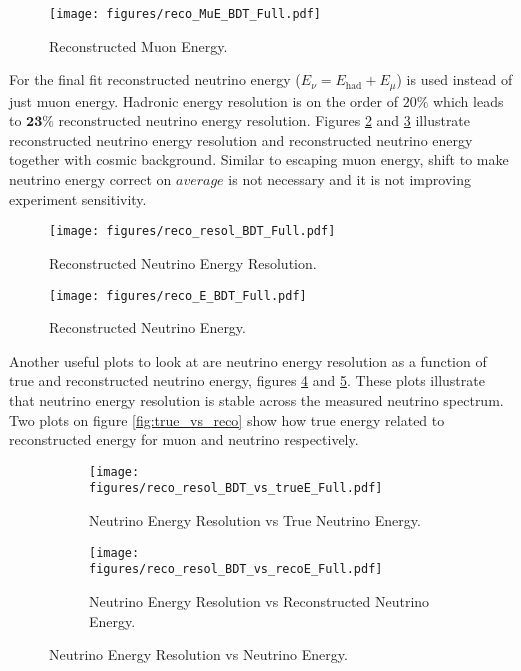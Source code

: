 \begin{figure}[!th]
\centering
\texttt{[image: figures/reco\_MuE\_BDT\_Full.pdf]}
\caption{Reconstructed Muon Energy.}
\label{fig:recoMuE}
\end{figure}

For the final fit reconstructed neutrino energy ($E_\nu = E_{\text{had}} + E_\mu$) is used instead 
of just muon energy. Hadronic energy resolution is on the order of $20\%$ which leads to 
$\textbf{23\%}$ reconstructed neutrino energy resolution. Figures \ref{fig:recoE_resol} and 
\ref{fig:recoE} illustrate reconstructed neutrino energy resolution and reconstructed neutrino
energy together with cosmic background. Similar to escaping muon energy, shift to make neutrino
energy correct on $\textit{average}$ is not necessary and it is not improving experiment sensitivity.
\begin{figure}[!th]
\centering
\texttt{[image: figures/reco\_resol\_BDT\_Full.pdf]}
\caption{Reconstructed Neutrino Energy Resolution.}
\label{fig:recoE_resol}
\end{figure}

\begin{figure}[!th]
\centering
\texttt{[image: figures/reco\_E\_BDT\_Full.pdf]}
\caption{Reconstructed Neutrino Energy.}
\label{fig:recoE}
\end{figure}

Another useful plots to look at are neutrino energy resolution as a function of true and reconstructed
neutrino energy, figures \ref{fig:resol_vs_trueE} and \ref{fig:resol_vs_recoE}. These plots illustrate that 
neutrino energy resolution is stable across the measured neutrino spectrum. Two plots on figure 
\ref{fig:true_vs_reco} show how true energy related to reconstructed energy for muon and neutrino respectively.
\begin{figure}[!th]
\centering
\begin{subfigure}[t]{0.95\textwidth}
  \centering
  \texttt{[image: figures/reco\_resol\_BDT\_vs\_trueE\_Full.pdf]}
  \caption{Neutrino Energy Resolution vs True Neutrino Energy.}
  \label{fig:resol_vs_trueE}
\end{subfigure}
\vspace{0.5cm}
\newline
\begin{subfigure}[t]{0.95\textwidth}
  \centering
  \texttt{[image: figures/reco\_resol\_BDT\_vs\_recoE\_Full.pdf]}
  \caption{Neutrino Energy Resolution vs Reconstructed Neutrino Energy.}
  \label{fig:resol_vs_recoE}
\end{subfigure}
\caption{ Neutrino Energy Resolution vs Neutrino Energy.}
\label{fig:resol_vs_E}
\end{figure}


